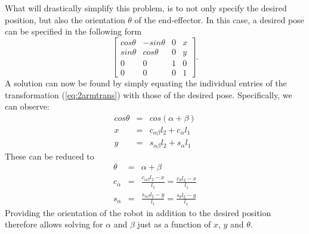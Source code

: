 What will drastically simplify this problem, is to not only specify the desired position, but also the orientation $\theta$ of the end-effector. In this case, a desired pose can be specified in the following form
\begin{equation}
\left[
\begin{array}{cccc}
cos\theta & -sin\theta & 0 & x\\
sin\theta & cos\theta & 0 & y\\
0 & 0 & 1 & 0\\
0 & 0 & 0 & 1
\end{array}
\right].
\end{equation}
A solution can now be found by simply equating the individual entries of the transformation (\ref{eq:2armtrans}) with those of the desired pose. Specifically, we can observe:
\begin{eqnarray}
cos\theta &=& cos(\alpha+\beta)\\
\nonumber
x &=& c_{\alpha\beta}l_2+c_\alpha l_1\\
\nonumber
y &=& s_{\alpha\beta}l_2+s_\alpha l_1
\end{eqnarray}
These can be reduced to
\begin{eqnarray}
\theta &=& \alpha + \beta \nonumber \\
c_\alpha &=& \frac{c_{\alpha\beta}l_2-x}{l_1}=\frac{c_\theta l_2-x}{l_1} \\
s_\alpha &=& \frac{s_{\alpha\beta}l_2-y}{l_1}=\frac{s_\theta l_2-y}{l_1} \nonumber
\end{eqnarray}
Providing the orientation of the robot in addition to the desired position therefore allows solving for $\alpha$ and $\beta$ just as a function of $x$, $y$ and $\theta$.


